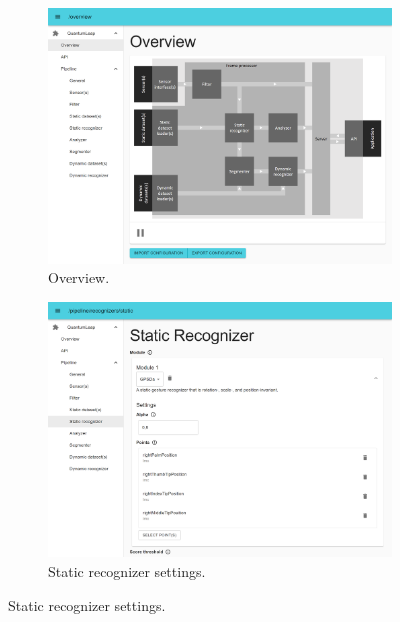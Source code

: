 \begin{figure}[!b]
    \centering
    \begin{subfigure}{.49\textwidth}
        \centering
        \includegraphics[width=\linewidth]{Figures/QuantumLeap/UI/overview.pdf}  
        \vspace{-15pt}
        \captionsetup{width=.9\linewidth}
        \caption{Overview.}
        \label{fig:quantumleap:ui:1}
    \end{subfigure}
    \begin{subfigure}{.49\textwidth}
        \centering
        \includegraphics[width=\linewidth]{Figures/QuantumLeap/UI/module-static_recognizer.pdf}  
        \vspace{-15pt}
        \captionsetup{width=.9\linewidth}
        \caption{Static recognizer settings.}
        \label{fig:quantumleap:ui:3}
    \end{subfigure}
    

\end{figure}
